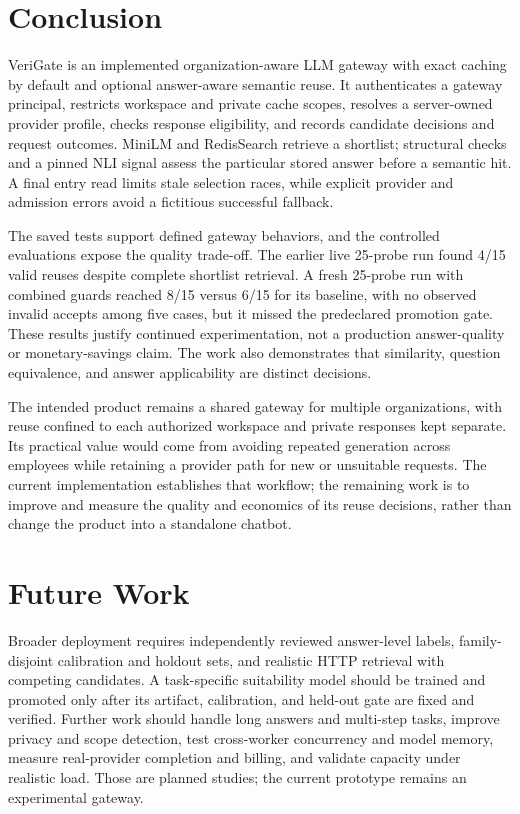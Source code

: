 \section{Conclusion}
VeriGate is an implemented organization-aware LLM gateway with exact caching by default and optional answer-aware semantic reuse. It authenticates a gateway principal, restricts workspace and private cache scopes, resolves a server-owned provider profile, checks response eligibility, and records candidate decisions and request outcomes. MiniLM and RedisSearch retrieve a shortlist; structural checks and a pinned NLI signal assess the particular stored answer before a semantic hit. A final entry read limits stale selection races, while explicit provider and admission errors avoid a fictitious successful fallback.

The saved tests support defined gateway behaviors, and the controlled evaluations expose the quality trade-off. The earlier live 25-probe run found 4/15 valid reuses despite complete shortlist retrieval. A fresh 25-probe run with combined guards reached 8/15 versus 6/15 for its baseline, with no observed invalid accepts among five cases, but it missed the predeclared promotion gate. These results justify continued experimentation, not a production answer-quality or monetary-savings claim. The work also demonstrates that similarity, question equivalence, and answer applicability are distinct decisions.

The intended product remains a shared gateway for multiple organizations, with reuse confined to each authorized workspace and private responses kept separate. Its practical value would come from avoiding repeated generation across employees while retaining a provider path for new or unsuitable requests. The current implementation establishes that workflow; the remaining work is to improve and measure the quality and economics of its reuse decisions, rather than change the product into a standalone chatbot.

\section{Future Work}
Broader deployment requires independently reviewed answer-level labels, family-disjoint calibration and holdout sets, and realistic HTTP retrieval with competing candidates. A task-specific suitability model should be trained and promoted only after its artifact, calibration, and held-out gate are fixed and verified. Further work should handle long answers and multi-step tasks, improve privacy and scope detection, test cross-worker concurrency and model memory, measure real-provider completion and billing, and validate capacity under realistic load. Those are planned studies; the current prototype remains an experimental gateway.
